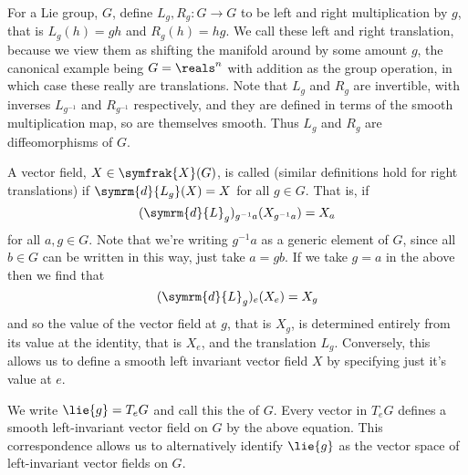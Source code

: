 \documentclass[fleqn]{NotesClass}
\renewcommand{\dl}{\symrm{d}}
\newcommand{\vectorFields}{\symfrak{X}}
\begin{document}
    For a Lie group, \(G\), define \(L_g, R_g \colon G \to G\) to be left and right multiplication by \(g\), that is \(L_g(h) = gh\) and \(R_g(h) = hg\).
    We call these left and right translation, because we view them as shifting the manifold around by some amount \(g\), the canonical example being \(G = \reals^n\) with addition as the group operation, in which case these really are translations.
    Note that \(L_g\) and \(R_g\) are invertible, with inverses \(L_{g^{-1}}\) and \(R_{g^{-1}}\) respectively, and they are defined in terms of the smooth multiplication map, so are themselves smooth.
    Thus \(L_g\) and \(R_g\) are diffeomorphisms of \(G\).
    
    A vector field, \(X \in \vectorFields(G)\), is called  (similar definitions hold for right translations) if \(\dl{L_g}(X) = X\) for all \(g \in G\).
    That is, if
    \begin{equation}
        (\dl{L}_g)_{g^{-1}a}(X_{g^{-1}a}) = X_a
    \end{equation}
    for all \(a, g \in G\).
    Note that we're writing \(g^{-1}a\) as a generic element of \(G\), since all \(b \in G\) can be written in this way, just take \(a = gb\).
    If we take \(g = a\) in the above then we find that
    \begin{equation}
        (\dl{L}_g)_e(X_e) = X_g
    \end{equation}
    and so the value of the vector field at \(g\), that is \(X_g\), is determined entirely from its value at the identity, that is \(X_e\), and the translation \(L_g\).
    Conversely, this allows us to define a smooth left invariant vector field \(X\) by specifying just it's value at \(e\).
    
    We write \(\lie{g} = T_eG\) and call this the  of \(G\).
    Every vector in \(T_eG\) defines a smooth left-invariant vector field on \(G\) by the above equation.
    This correspondence allows us to alternatively identify \(\lie{g}\) as the vector space of left-invariant vector fields on \(G\).
    
%        
%
\end{document}
